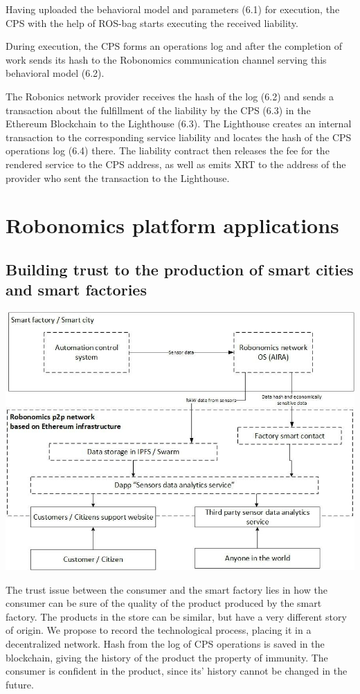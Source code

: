 \documentclass{article}
\begin{document}
Having uploaded the behavioral model and parameters (6.1) for execution, the CPS with the help of ROS-bag starts executing the received liability.

During execution, the CPS forms an operations log and after the completion of work sends its hash to the Robonomics communication channel serving this behavioral model (6.2).

The Robonics network provider receives the hash of the log (6.2) and sends a transaction about the fulfillment of the liability by the CPS (6.3) in the Ethereum Blockchain to the Lighthouse (6.3). The Lighthouse creates an internal transaction to the corresponding service liability and locates the hash of the CPS operations log (6.4) there. The liability contract then releases the fee for the rendered service to the CPS address, as well as emits XRT to the address of the provider who sent the transaction to the Lighthouse.

\section{Robonomics platform applications}

\subsection{Building trust to the production of smart cities and smart factories}

\includegraphics[width=1\textwidth]{app-1.png} 

The trust issue between the consumer and the smart factory lies in how the consumer can be sure of the quality of the product produced by the smart factory. The products in the store can be similar, but have a very different story of origin. We propose to record the technological process, placing it in a decentralized network. Hash from the log of CPS operations is saved in the blockchain, giving the history of the product the property of immunity. The consumer is confident in the product, since its’ history cannot be changed in the future.
\end{document}
